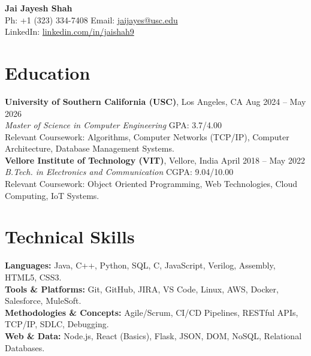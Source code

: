 \documentclass[letterpaper,10pt]{article}
\begin{document}
\begin{center}
    {\LARGE \textbf{Jai Jayesh Shah}} \\
    \vspace{2pt}
    \small
    Ph: +1 (323) 334-7408 \quad Email: \href{mailto:jaijayes@usc.edu}{jaijayes@usc.edu} \\
    LinkedIn: \href{https://www.linkedin.com/in/jaishah9}{linkedin.com/in/jaishah9} \\
    \vspace{-8pt}
\end{center}

\section*{Education}
\textbf{University of Southern California (USC)}, Los Angeles, CA \hfill Aug 2024 -- May 2026 \\
\textit{Master of Science in Computer Engineering} \hfill GPA: 3.7/4.00 \\
Relevant Coursework: Algorithms, Computer Networks (TCP/IP), Computer Architecture, Database Management Systems. \\
\vspace{2pt}
\textbf{Vellore Institute of Technology (VIT)}, Vellore, India \hfill April 2018 -- May 2022 \\
\textit{B.Tech. in Electronics and Communication} \hfill CGPA: 9.04/10.00 \\
Relevant Coursework: Object Oriented Programming, Web Technologies, Cloud Computing, IoT Systems.

\section*{Technical Skills}
\textbf{Languages:} Java, C++, Python, SQL, C, JavaScript, Verilog, Assembly, HTML5, CSS3. \\
\textbf{Tools \& Platforms:} Git, GitHub, JIRA, VS Code, Linux, AWS, Docker, Salesforce, MuleSoft. \\
\textbf{Methodologies \& Concepts:} Agile/Scrum, CI/CD Pipelines, RESTful APIs, TCP/IP, SDLC, Debugging. \\
\textbf{Web \& Data:} Node.js, React (Basics), Flask, JSON, DOM, NoSQL, Relational Databases.

\end{document}
